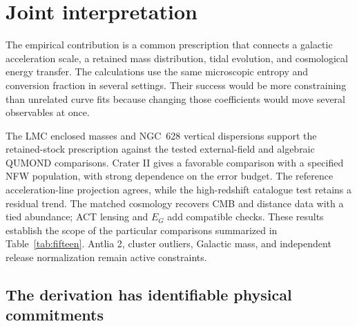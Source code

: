 \section{Joint interpretation}

The empirical contribution is a common prescription that connects a
galactic acceleration scale, a retained mass distribution, tidal evolution,
and cosmological energy transfer. The calculations use the same
microscopic entropy and conversion fraction in several settings. Their
success would be more constraining than unrelated curve fits because
changing those coefficients would move several observables at once.

The LMC enclosed masses and NGC~628 vertical dispersions support
the retained-stock prescription against the tested external-field and
algebraic QUMOND comparisons. Crater II gives a favorable comparison
with a specified NFW population, with strong dependence on the error
budget. The reference acceleration-line projection agrees, while the
high-redshift catalogue test retains a residual trend. The matched
cosmology recovers CMB and distance data with a tied abundance; ACT
lensing and $E_G$ add compatible checks. These results establish the
scope of the particular comparisons summarized in Table~\ref{tab:fifteen}.
Antlia 2, cluster outliers, Galactic mass, and independent release
normalization remain active constraints.

\subsection{The derivation has identifiable physical commitments}

